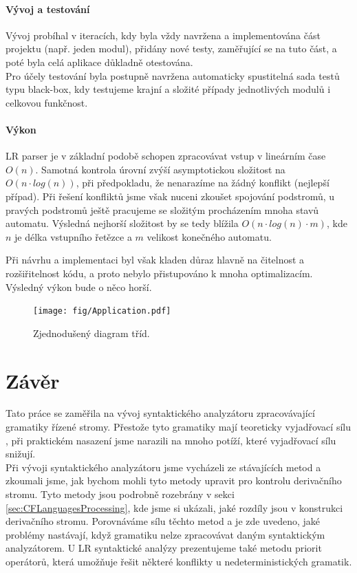 \subsubsection*{Vývoj a testování}

Vývoj probíhal v iteracích, kdy byla vždy navržena a implementována část
projektu (např. jeden modul), přidány nové testy, zaměřující se na
tuto část, a poté byla celá aplikace důkladně otestována.\\

Pro účely testování byla postupně navržena automaticky spustitelná sada testů
typu black-box, kdy testujeme krajní a složité případy jednotlivých modulů
i celkovou funkčnost.

\subsubsection*{Výkon}

LR parser je v základní podobě schopen zpracovávat vstup v lineárním čase $O(n)$.
Samotná kontrola úrovní zvýší asymptotickou složitost na $O(n \cdot log(n))$, při
předpokladu, že nenarazíme na žádný konflikt (nejlepší případ).
Při řešení konfliktů jsme však nuceni zkoušet spojování podstromů,
u pravých podstromů ještě pracujeme se složitým procházením mnoha stavů automatu.
Výsledná nejhorší složitost by se tedy blížila $O(n \cdot log(n) \cdot m)$,
kde $n$ je délka vstupního řetězce a $m$ velikost konečného automatu.

Při návrhu a implementaci byl však kladen důraz hlavně na čitelnost a
rozšiřitelnost kódu, a proto nebylo přistupováno k mnoha optimalizacím.
Výsledný výkon bude o něco horší.

\begin{figure}[H]
  \centering
  \texttt{[image: fig/Application.pdf]}
  \caption{Zjednodušený diagram tříd.}
\end{figure}


\chapter{Závěr}

Tato práce se zaměřila na vývoj syntaktického analyzátoru zpracovávající
gramatiky řízené stromy. Přestože tyto gramatiky mají teoreticky vyjadřovací
sílu , při praktickém nasazení jsme narazili na mnoho
potíží, které vyjadřovací sílu snižují.\\

Při vývoji syntaktického analyzátoru jsme vycházeli ze stávajících metod a
zkoumali jsme, jak bychom mohli tyto metody upravit pro kontrolu
derivačního stromu. Tyto metody jsou podrobně rozebrány v sekci
\ref{sec:CFLanguagesProcessing}, kde jsme si ukázali, jaké rozdíly jsou v konstrukci
derivačního stromu.
Porovnáváme sílu těchto metod a je zde uvedeno, jaké problémy nastávají, když
gramatiku nelze zpracovávat daným syntaktickým analyzátorem.
U LR syntaktické analýzy prezentujeme také metodu priorit operátorů, která
umožňuje řešit některé konflikty u nedeterministických gramatik.\\

